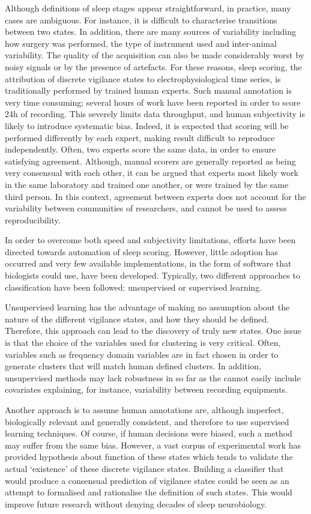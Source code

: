 Although definitions of sleep stages appear straightforward, in practice, many cases are ambiguous.
For instance, it is difficult to characterise transitions between two states.
In addition, there are many sources of variability including how surgery was performed, the type of instrument used and inter-animal variability.
The quality of the acquisition can also be made considerably worst by noisy signals or by the presence of artefacts.
For these reasons, sleep scoring, \ie{} the attribution of discrete vigilance states to electrophysiological time series,
is traditionally performed by trained human experts.
Such manual annotation is very time consuming; several hours of work have been reported in order to score 24h of recording.
This severely limits data throughput, and human subjectivity is likely to introduce systematic bias.
Indeed, it is expected that scoring will be performed differently by each expert, making result difficult to reproduce independently.
Often, two experts score the same data, in order to ensure satisfying agreement.
Although, manual scorers are generally reported as being very consensual with each other\citationneeded{},
it can be argued that experts most likely work in the same laboratory and trained one another, or were trained by the same third person.
In this context, agreement between experts does not account for the variability between communities of researchers, and cannot be used to assess reproducibility.

In order to overcome both speed and subjectivity limitations, efforts have been directed towards automation of sleep scoring.
However, little adoption has occurred and very few available implementations, in the form of software that biologists could use, have been developed.
Typically, two different approaches to classification have been followed: unsupervised or supervised learning.

Unsupervised learning has the advantage of making no assumption about the nature of the different vigilance states, and how they should be defined.
Therefore, this approach can lead to the discovery of truly new states.
One issue is that the choice of the variables used for clustering is very critical.
Often, variables such as frequency domain variables are in fact chosen in order to generate clusters that will match human defined clusters.
In addition, unsupervised methods may lack robustness in so far as the cannot easily include covariates explaining, for instance, variability between recording equipments.

Another approach is to assume human annotations are, although imperfect, biologically relevant and generally consistent,
 and therefore to use supervised learning techniques.
Of course, if human decisions were biased, such a method may suffer from the same bias.
However, a vast corpus of experimental work has provided hypothesis about function of these states which tends to validate the actual `existence' of these discrete vigilance states.
Building a classifier that would produce a consensual prediction of vigilance states could be seen as an attempt to formalised and rationalise the definition of such states.
This would improve future research without denying decades of sleep neurobiology.

